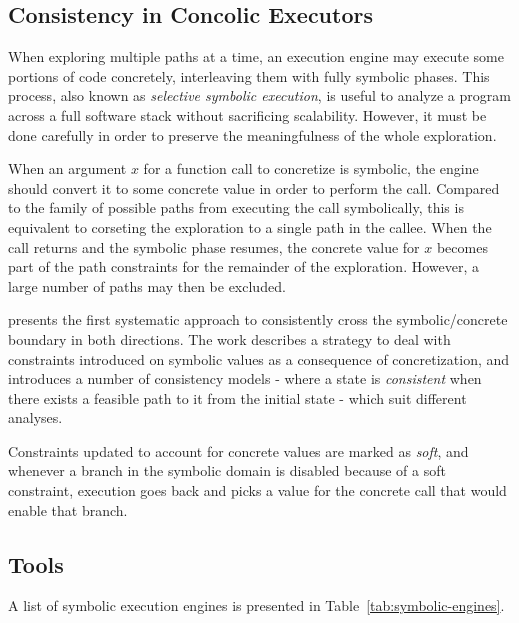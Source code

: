 \subsection{Consistency in Concolic Executors}  %

When exploring multiple paths at a time, an execution engine may execute some portions of code concretely, interleaving them with fully symbolic phases. This process, also known as {\em selective symbolic execution}, is useful to analyze a program across a full software stack without sacrificing scalability. However, it must be done carefully in order to preserve the meaningfulness of the whole exploration.

When an argument $x$ for a function call to concretize is symbolic, the engine should convert it to some concrete value in order to perform the call. Compared to the family of possible paths from executing the call symbolically, this is equivalent to corseting the exploration to a single path in the callee. When the call returns and the symbolic phase resumes, the concrete value for $x$ becomes part of the path constraints for the remainder of the exploration. However, a large number of paths may then be excluded.

\cite{CKC-TOCS12} presents the first systematic approach to consistently cross the symbolic/concrete boundary in both directions. The work describes a strategy to deal with constraints introduced on symbolic values as a consequence of concretization, and introduces a number of consistency models - where a state is {\em consistent} when there exists a feasible path to it from the initial state - which suit different analyses.

Constraints updated to account for concrete values are marked as {\em soft}, and whenever a branch in the symbolic domain is disabled because of a soft constraint, execution goes back and picks a value for the concrete call that would enable that branch.


\subsection{Tools}
A list of symbolic execution engines is presented in Table~\ref{tab:symbolic-engines}.

